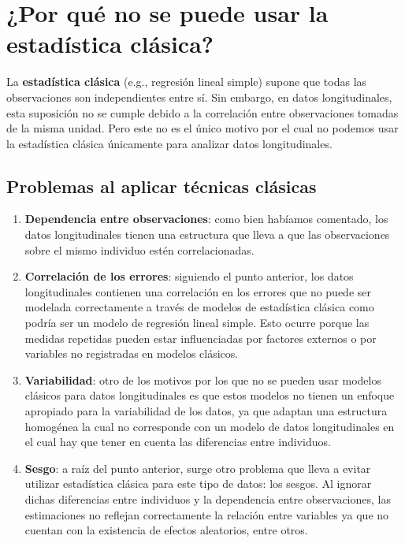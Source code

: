 \documentclass[
  letterpaper,
  DIV=11,
  numbers=noendperiod]{scrreprt}
\providecommand{\tightlist}{%
  \setlength{\itemsep}{0pt}\setlength{\parskip}{0pt}}\usepackage{longtable,booktabs,array}
\begin{document}
\section{¿Por qué no se puede usar la estadística
clásica?}\label{por-quuxe9-no-se-puede-usar-la-estaduxedstica-cluxe1sica}

La \textbf{estadística clásica} (e.g., regresión lineal simple) supone
que todas las observaciones son independientes entre sí. Sin embargo, en
datos longitudinales, esta suposición no se cumple debido a la
correlación entre observaciones tomadas de la misma unidad. Pero este no
es el único motivo por el cual no podemos usar la estadística clásica
únicamente para analizar datos longitudinales.

\subsection{Problemas al aplicar técnicas
clásicas}\label{problemas-al-aplicar-tuxe9cnicas-cluxe1sicas}

\begin{enumerate}
\def\labelenumi{\arabic{enumi}.}
\tightlist
\item
  \textbf{Dependencia entre observaciones}: como bien habíamos
  comentado, los datos longitudinales tienen una estructura que lleva a
  que las observaciones sobre el mismo individuo estén correlacionadas.
\item
  \textbf{Correlación de los errores}: siguiendo el punto anterior, los
  datos longitudinales contienen una correlación en los errores que no
  puede ser modelada correctamente a través de modelos de estadística
  clásica como podría ser un modelo de regresión lineal simple. Esto
  ocurre porque las medidas repetidas pueden estar influenciadas por
  factores externos o por variables no registradas en modelos clásicos.
\item
  \textbf{Variabilidad}: otro de los motivos por los que no se pueden
  usar modelos clásicos para datos longitudinales es que estos modelos
  no tienen un enfoque apropiado para la variabilidad de los datos, ya
  que adaptan una estructura homogénea la cual no corresponde con un
  modelo de datos longitudinales en el cual hay que tener en cuenta las
  diferencias entre individuos.
\item
  \textbf{Sesgo}: a raíz del punto anterior, surge otro problema que
  lleva a evitar utilizar estadística clásica para este tipo de datos:
  los sesgos. Al ignorar dichas diferencias entre individuos y la
  dependencia entre observaciones, las estimaciones no reflejan
  correctamente la relación entre variables ya que no cuentan con la
  existencia de efectos aleatorios, entre otros.
\end{enumerate}
\end{document}

